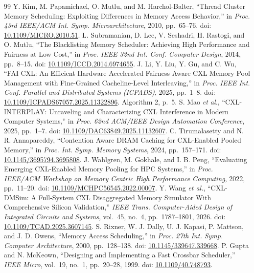 \documentclass[10pt,letterpaper,twocolumn]{article}
\begin{document}
\begin{thebibliography}{99}
 Y. Kim, M. Papamichael, O. Mutlu, and M. Harchol-Balter, ``Thread Cluster Memory Scheduling: Exploiting Differences in Memory Access Behavior,'' in \emph{Proc. 43rd IEEE/ACM Int. Symp. Microarchitecture}, 2010, pp.~65--76. doi: \href{https://doi.org/10.1109/MICRO.2010.51}{10.1109/MICRO.2010.51}.
 L. Subramanian, D. Lee, V. Seshadri, H. Rastogi, and O. Mutlu, ``The Blacklisting Memory Scheduler: Achieving High Performance and Fairness at Low Cost,'' in \emph{Proc. IEEE 32nd Int. Conf. Computer Design}, 2014, pp.~8--15. doi: \href{https://doi.org/10.1109/ICCD.2014.6974655}{10.1109/ICCD.2014.6974655}.
 J. Li, Y. Liu, Y. Gu, and C. Wu, ``FAI-CXL: An Efficient Hardware-Accelerated Fairness-Aware CXL Memory Pool Management with Fine-Grained Cacheline-Level Interleaving,'' in \emph{Proc. IEEE Int. Conf. Parallel and Distributed Systems (ICPADS)}, 2025, pp.~1--8. doi: \href{https://doi.org/10.1109/ICPADS67057.2025.11322896}{10.1109/ICPADS67057.2025.11322896}. Algorithm 2, p.~5.
 S. Mao \emph{et al.}, ``CXL-INTERPLAY: Unraveling and Characterizing CXL Interference in Modern Computer Systems,'' in \emph{Proc. 62nd ACM/IEEE Design Automation Conference}, 2025, pp.~1--7. doi: \href{https://doi.org/10.1109/DAC63849.2025.11132607}{10.1109/DAC63849.2025.11132607}.
 C. Tirumalasetty and N. R. Annapareddy, ``Contention Aware DRAM Caching for CXL-Enabled Pooled Memory,'' in \emph{Proc. Int. Symp. Memory Systems}, 2024, pp.~157--171. doi: \href{https://doi.org/10.1145/3695794.3695808}{10.1145/3695794.3695808}.
 J. Wahlgren, M. Gokhale, and I. B. Peng, ``Evaluating Emerging CXL-Enabled Memory Pooling for HPC Systems,'' in \emph{Proc. IEEE/ACM Workshop on Memory Centric High Performance Computing}, 2022, pp.~11--20. doi: \href{https://doi.org/10.1109/MCHPC56545.2022.00007}{10.1109/MCHPC56545.2022.00007}.
 Y. Wang \emph{et al.}, ``CXL-DMSim: A Full-System CXL Disaggregated Memory Simulator With Comprehensive Silicon Validation,'' \emph{IEEE Trans. Computer-Aided Design of Integrated Circuits and Systems}, vol.~45, no.~4, pp.~1787--1801, 2026. doi: \href{https://doi.org/10.1109/TCAD.2025.3607145}{10.1109/TCAD.2025.3607145}.
 S. Rixner, W. J. Dally, U. J. Kapasi, P. Mattson, and J. D. Owens, ``Memory Access Scheduling,'' in \emph{Proc. 27th Int. Symp. Computer Architecture}, 2000, pp.~128--138. doi: \href{https://doi.org/10.1145/339647.339668}{10.1145/339647.339668}.
 P. Gupta and N. McKeown, ``Designing and Implementing a Fast Crossbar Scheduler,'' \emph{IEEE Micro}, vol.~19, no.~1, pp.~20--28, 1999. doi: \href{https://doi.org/10.1109/40.748793}{10.1109/40.748793}.

\end{thebibliography}
\end{document}
